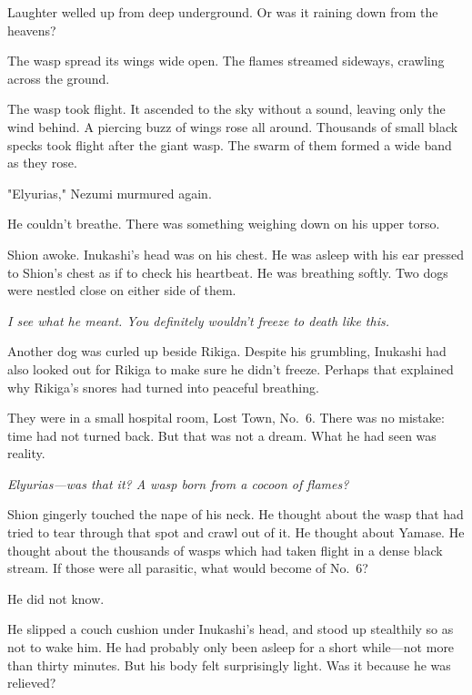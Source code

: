 Laughter welled up from deep underground. Or was it raining down from
the heavens?



The wasp spread its wings wide open. The flames streamed sideways,
crawling across the ground.



The wasp took flight. It ascended to the sky without a sound, leaving
only the wind behind. A piercing buzz of wings rose all around.
Thousands of small black specks took flight after the giant wasp. The
swarm of them formed a wide band as they rose.

"Elyurias," Nezumi murmured again.

\mybreak

He couldn't breathe. There was something weighing down on his upper
torso.

Shion awoke. Inukashi's head was on his chest. He was asleep with his
ear pressed to Shion's chest as if to check his heartbeat. He was
breathing softly. Two dogs were nestled close on either side of them.

\emph{I see what he meant. You definitely wouldn't freeze to death like this.}

Another dog was curled up beside Rikiga. Despite his grumbling, Inukashi
had also looked out for Rikiga to make sure he didn't freeze. Perhaps
that explained why Rikiga's snores had turned into peaceful breathing.

They were in a small hospital room, Lost Town, No.~6. There was no
mistake: time had not turned back. But that was not a dream. What he had
seen was reality.

\emph{Elyurias---was that it? A wasp born from a cocoon of flames?}

Shion gingerly touched the nape of his neck. He thought about the wasp
that had tried to tear through that spot and crawl out of it. He thought
about Yamase. He thought about the thousands of wasps which had taken
flight in a dense black stream. If those were all parasitic, what would
become of No.~6?

He did not know.

He slipped a couch cushion under Inukashi's head, and stood up
stealthily so as not to wake him. He had probably only been asleep for a
short while---not more than thirty minutes. But his body felt surprisingly
light. Was it because he was relieved?

